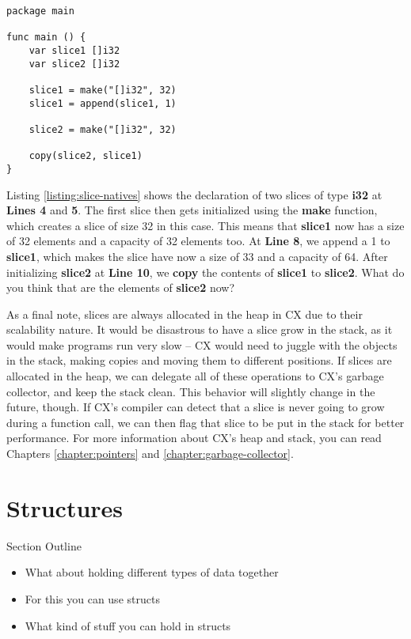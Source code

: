 \documentclass[11pt,fleqn,openany]{book} %
\begin{document}
\begin{lstlisting}[caption={Slice-specific Native Functions},captionpos=b,label={listing:slice-natives}]
package main

func main () {
	var slice1 []i32
    var slice2 []i32
    
    slice1 = make("[]i32", 32)
    slice1 = append(slice1, 1)
    
    slice2 = make("[]i32", 32)
    
    copy(slice2, slice1)
}
\end{lstlisting}

Listing \ref{listing:slice-natives} shows the declaration of two slices of type \textbf{i32} at \textbf{Lines 4} and \textbf{5}. The first slice then gets initialized using the \textbf{make} function, which creates a slice of size 32 in this case. This means that \textbf{slice1} now has a size of 32 elements and a capacity of 32 elements too. At \textbf{Line 8}, we append a 1 to \textbf{slice1}, which makes the slice have now a size of 33 and a capacity of 64. After initializing \textbf{slice2} at \textbf{Line 10}, we \textbf{copy} the contents of \textbf{slice1} to \textbf{slice2}. What do you think that are the elements of \textbf{slice2} now?

As a final note, slices are always allocated in the heap in CX due to their scalability nature. It would be disastrous to have a slice grow in the stack, as it would make programs run very slow -- CX would need to juggle with the objects in the stack, making copies and moving them to different positions. If slices are allocated in the heap, we can delegate all of these operations to CX's garbage collector, and keep the stack clean. This behavior will slightly change in the future, though. If CX's compiler can detect that a slice is never going to grow during a function call, we can then flag that slice to be put in the stack for better performance. For more information about CX's heap and stack, you can read Chapters \ref{chapter:pointers} and \ref{chapter:garbage-collector}.

\section{Structures}

\begin{remark}
Section Outline
    \begin{itemize}
    \item What about holding different types of data together
    \item For this you can use structs
    \item What kind of stuff you can hold in structs
    \end{itemize}
\end{remark}
\end{document}
